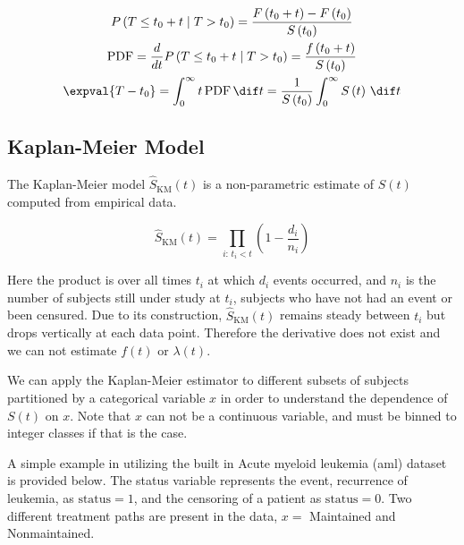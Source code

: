 \begin{subequations}\label{eq:Survival:efl_der}
\begin{gather}
P\left(T \leq t_{0} + t \mid T > t_{0}\right)
= \frac{F\left(t_{0} + t\right) - F\left(t_{0}\right)}{S\left(t_{0}\right)} \label{eq:Survival:efl_der:P} \\
\text{PDF}
= \frac{d}{dt} P\left(T \leq t_{0} + t \mid T > t_{0}\right)
= \frac{f\left(t_{0} + t\right)}{S\left(t_{0}\right)} \label{eq:Survival:efl_der:pdf} \\
\expval{T-t_{0}}
= \int_{0}^{\infty} t \, \text{PDF} \, \dif t
= \frac{1}{S\left(t_{0}\right)} \int_{0}^{\infty} S\left(t\right) \, \dif t \label{eq:Survival:efl_der:efl}
\end{gather}
\end{subequations}

\subsection{Kaplan-Meier Model}
\label{additional:Survival:KM}

The Kaplan-Meier model $\hat{S}_{\text{KM}}\left(t\right)$ is a non-parametric estimate of $S\left(t\right)$ computed from empirical data.

\begin{equation}\label{eq:Survival:KM}
\hat{S}_{\text{KM}}\left(t\right) = \prod_{i:\,t_{i} < t} \left(1 - \frac{d_{i}}{n_{i}}\right)
\end{equation}

\noindent Here the product is over all times $t_{i}$ at which $d_{i}$ events occurred,
and $n_{i}$ is the number of subjects still under study at $t_{i}$,
\ie subjects who have not had an event or been censured.
Due to its construction, $\hat{S}_{\text{KM}}\left(t\right)$ remains steady
between $t_{i}$ but drops vertically at each data point.
Therefore the derivative does not exist and we can not estimate $f\left(t\right)$ or $\lambda\left(t\right)$.


We can apply the Kaplan-Meier estimator to different subsets of subjects partitioned by a categorical variable $x$
in order to understand the dependence of $S\left(t\right)$ on $x$.
Note that $x$ can not be a continuous variable, and must be binned to integer classes if that is the case.

A simple example in \R utilizing the built in Acute myeloid leukemia (aml) dataset is provided below.
The status variable represents the event, recurrence of leukemia, as $\text{status}=1$, and the censoring of a patient as $\text{status}=0$.
Two different treatment paths are present in the data, $x=$ Maintained and Nonmaintained.

